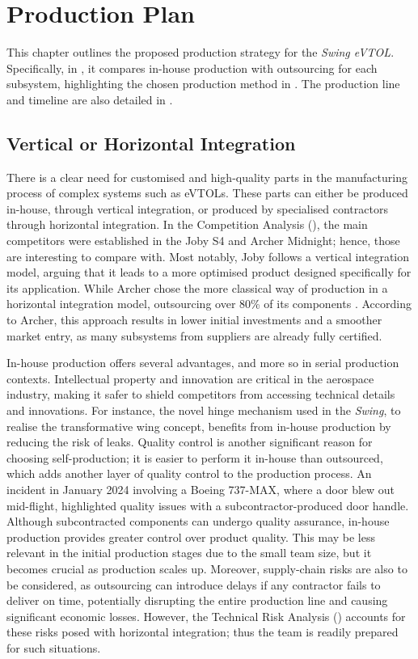 \chapter{Production Plan}
\label{ch:Production_Plan}
This chapter outlines the proposed production strategy for the \textit{Swing eVTOL}.
Specifically, in , it compares in-house production with outsourcing for each subsystem, highlighting the chosen production method in .
The production line and timeline are also detailed in .

\section{Vertical or Horizontal Integration}
\label{sec:vert_hori_integration}
There is a clear need for customised and high-quality parts in the manufacturing process of complex systems such as eVTOLs.
These parts can either be produced in-house, through vertical integration, or produced by specialised contractors through horizontal integration. 
In the Competition Analysis (), the main competitors were established in the Joby S4 and Archer Midnight; hence, those are interesting to compare with.
Most notably, Joby follows a vertical integration model, arguing that it leads to a more optimised product designed specifically for its application. 
While Archer chose the more classical way of production in a horizontal integration model, outsourcing over 80\% of its components \cite{integrationjobyvarcher}.
According to Archer, this approach results in lower initial investments and a smoother market entry, as many subsystems from suppliers are already fully certified.

In-house production offers several advantages, and more so in serial production contexts. 
Intellectual property and innovation are critical in the aerospace industry, making it safer to shield competitors from accessing technical details and innovations.
For instance, the novel hinge mechanism used in the \textit{Swing}, to realise the transformative wing concept, benefits from in-house production by reducing the risk of leaks.
Quality control is another significant reason for choosing self-production; it is easier to perform it in-house than outsourced, which adds another layer of quality control to the production process.
An incident in January 2024 involving a Boeing 737-MAX, where a door blew out mid-flight, highlighted quality issues with a subcontractor-produced door handle. 
Although subcontracted components can undergo quality assurance, in-house production provides greater control over product quality. 
This may be less relevant in the initial production stages due to the small team size, but it becomes crucial as production scales up.
Moreover, supply-chain risks are also to be considered, as outsourcing can introduce delays if any contractor fails to deliver on time, potentially disrupting the entire production line and causing significant economic losses.
However, the Technical Risk Analysis () accounts for these risks posed with horizontal integration; thus the team is readily prepared for such situations.

